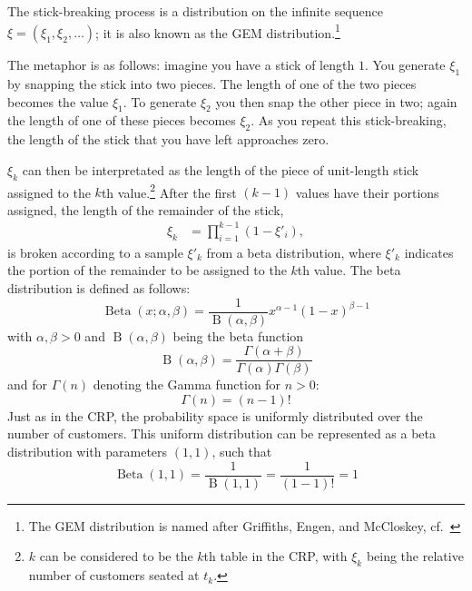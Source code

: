 The stick-breaking process\cite{Ishwaran2001Gibbs} is a distribution on the infinite sequence  $\xi = (\xi_1,\xi_2,\ldots)$; it is also known as the GEM distribution.\footnote{The GEM distribution is named after Griffiths, Engen, and McCloskey, cf.\ \cite{Pitman1997The}}

The metaphor is as follows: imagine you have a stick of length $1$. You generate $\xi_1$ by snapping the stick into two pieces. The length of one of the two pieces becomes the value $\xi_1$. To generate $\xi_2$ you then snap the other piece in two; again the length of one of these pieces becomes $\xi_2$. As you repeat this stick-breaking, the length of the stick that you have left approaches zero.

$\xi_k$ can then be interpretated as the length of the piece of unit-length stick assigned to the $k$th value.\footnote{$k$ can be considered to be the $k$th table in the CRP, with $\xi_k$ being the relative number of customers seated at $t_k$.} After the first $(k-1)$ values have their portions assigned, the length of the remainder of the stick, 
\begin{align}\label{eq:stickbreaking}
	\xi_k &= \prod_{i=1}^{k-1}(1-\xi'_i),
\end{align}
is broken according to a sample $\xi'_k$ from a beta distribution, where $\xi'_k$ indicates the portion of the remainder to be assigned to the $k$th value. The beta distribution is defined as follows:
\begin{equation} 
	\operatorname{Beta}(x; \alpha, \beta) = \frac{1}{\operatorname{B}(\alpha,\beta)}x^{\alpha-1}(1-x)^{\beta-1}\label{eq:betad}
\end{equation}
with $\alpha,\beta >0$ and $\operatorname{B}(\alpha,\beta)$ being the beta function
\begin{equation}
	\operatorname{B}(\alpha,\beta) = \frac{\Gamma(\alpha+\beta)}{\Gamma(\alpha)\Gamma(\beta)}\label{eq:betaf}
\end{equation}
and for $\Gamma(n)$ denoting the Gamma function for $n>0$:
\begin{equation}
	\Gamma(n) = (n-1)!\label{eq:gammaf}
\end{equation}
Just as in the CRP, the probability space is uniformly distributed over the number of customers. This uniform distribution can be represented as a beta distribution with parameters $(1,1)$, such that 
\begin{equation}
	\operatorname{Beta}(1,1)=\frac{1}{\operatorname{B}(1,1)} = \frac{1}{(1-1)!} = 1
\end{equation}

